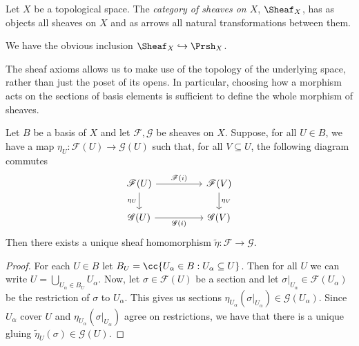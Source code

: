 \documentclass{article}
\begin{document}
\begin{definition}
  Let $X$ be a topological space. The \emph{category of sheaves on $X$},
  $\Sheaf_X$, has as objects all sheaves on $X$ and as arrows all natural
  transformations between them.
\end{definition}

We have the obvious inclusion $\Sheaf_X\hookrightarrow \Prsh_X$.

The sheaf axioms allows us to make use of the topology of the underlying
space, rather than just the poset of its opens. In particular, choosing
how a morphism acts on the sections of basis elements is sufficient
to define the whole morphism of sheaves.

\begin{lemma}
  Let $B$ be a basis of $X$ and let $\mathscr F,\mathscr G$ be sheaves on $X$. Suppose, for all $U\in B$,
  we have a map $\eta_U:\mathscr F(U)\to \mathscr G(U)$ such that, for all $V\subseteq U$, the following diagram commutes
  \begin{equation}
    \begin{tikzcd}
      \mathscr F(U) && \mathscr F(V) \\
      \mathscr G(U) && \mathscr G(V)
      \arrow["\mathscr F(i)", from=1-1, to=1-3]
      \arrow["{\eta_U}"', from=1-1, to=2-1]
      \arrow["{\eta_V}", from=1-3, to=2-3]
      \arrow["\mathscr G(i)"', from=2-1, to=2-3]
    \end{tikzcd}
  \end{equation}
  Then there exists a unique sheaf homomorphism $\tilde\eta : \mathscr F\to \mathscr G$.
  \begin{proof}
    For each $U \in B$ let $B_U = \cc{U_\alpha \in B : U_\alpha \subseteq U}$.
    Then for all $U$ we can write $U = \bigcup_{U_\alpha \in B_U} U_\alpha$.
    Now, let $\sigma \in \mathscr F(U)$ be a section and let $\sigma|_{U_\alpha} \in \mathscr F(U_\alpha)$
    be the restriction of $\sigma$ to $U_\alpha$. This gives us sections 
    $\eta_{U_\alpha}(\sigma|_{U_\alpha}) \in \mathscr G(U_\alpha)$. Since $U_\alpha$ cover $U$
    and $\eta_{U_\alpha}(\sigma|_{U_\alpha})$ agree on restrictions, 
    we have that there is a unique gluing $\tilde\eta_U(\sigma) \in \mathscr G(U)$.
    \missingproof {}
  \end{proof}
\end{lemma}
\end{document}
